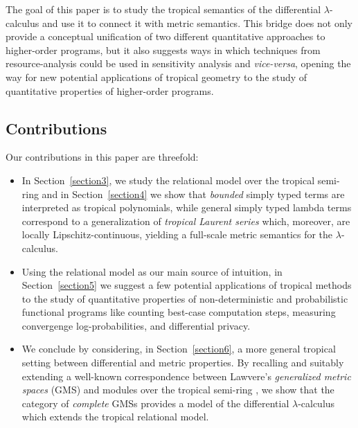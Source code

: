 The goal of this paper is to study the tropical semantics of the differential $\lambda$-calculus and use it to connect it with metric semantics. This bridge does not only provide a conceptual unification of two different quantitative approaches to higher-order programs, but it also 
suggests ways in which techniques from resource-analysis could be used in sensitivity analysis and \emph{vice-versa}, opening the way for new potential applications of tropical geometry to the study of quantitative properties of higher-order programs.


\subsection{Contributions}

Our contributions in this paper are threefold:
\begin{itemize}

\item In Section~\ref{section3}, we study the relational model over the tropical semi-ring%
and in Section~\ref{section4} we show that
\emph{bounded} simply typed terms are interpreted as tropical polynomials, while general
 simply typed lambda terms correspond to a generalization of \emph{tropical Laurent series} \cite{Porzio2021} which, moreover, are locally Lipschitz-continuous, yielding a full-scale metric semantics for the $\lambda$-calculus.


\item Using the relational model as our main source of intuition, in Section~\ref{section5} we suggest a few potential applications of tropical methods to the study of quantitative properties of non-deterministic and probabilistic functional programs like counting best-case computation steps, 
measuring convergenge log-probabilities, and 
differential privacy.

\item We conclude by considering, in Section~\ref{section6}, a more general tropical setting between differential and metric properties.
By recalling and suitably extending a well-known correspondence between Lawvere's \emph{generalized metric spaces} (GMS) \cite{Lawvere1973, Stubbe2014} and modules over the tropical semi-ring \cite{Russo2007}, we show that the category of \emph{complete} GMSs provides a model of the differential $\lambda$-calculus which extends the tropical relational model.
\end{itemize}
